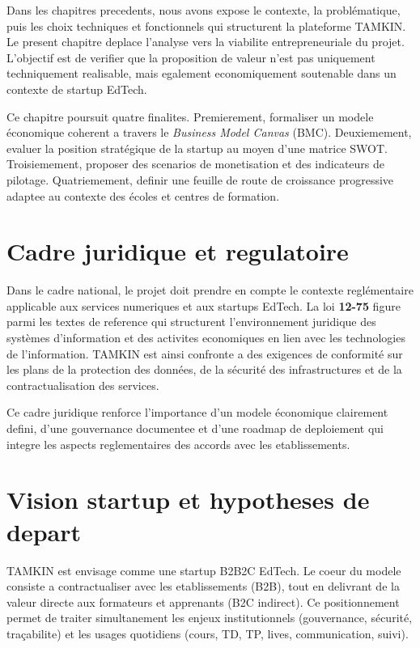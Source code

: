 \documentclass[12pt,a4paper,oneside]{report}
\begin{document}
Dans les chapitres precedents, nous avons expose le contexte, la problématique, puis les choix techniques et fonctionnels qui structurent la plateforme TAMKIN. Le present chapitre deplace l'analyse vers la viabilite entrepreneuriale du projet. L'objectif est de verifier que la proposition de valeur n'est pas uniquement techniquement realisable, mais egalement economiquement soutenable dans un contexte de startup EdTech.

Ce chapitre poursuit quatre finalites. Premierement, formaliser un modele économique coherent a travers le \textit{Business Model Canvas} (BMC)\cite{osterwalder2010bmc}. Deuxiemement, evaluer la position stratégique de la startup au moyen d'une matrice SWOT\cite{kotler2017marketing}. Troisiemement, proposer des scenarios de monetisation et des indicateurs de pilotage. Quatriemement, definir une feuille de route de croissance progressive adaptee au contexte des écoles et centres de formation.

\section{Cadre juridique et regulatoire}

Dans le cadre national, le projet doit prendre en compte le contexte reglémentaire applicable aux services numeriques et aux startups EdTech. La loi \textbf{12-75} figure parmi les textes de reference qui structurent l'environnement juridique des systèmes d'information et des activites economiques en lien avec les technologies de l'information. TAMKIN est ainsi confronte a des exigences de conformité sur les plans de la protection des données, de la sécurité des infrastructures et de la contractualisation des services.

Ce cadre juridique renforce l'importance d'un modele économique clairement defini, d'une gouvernance documentee et d'une roadmap de deploiement qui integre les aspects reglementaires des accords avec les etablissements.

\section{Vision startup et hypotheses de depart}

TAMKIN est envisage comme une startup B2B2C EdTech. Le coeur du modele consiste a contractualiser avec les etablissements (B2B), tout en delivrant de la valeur directe aux formateurs et apprenants (B2C indirect). Ce positionnement permet de traiter simultanement les enjeux institutionnels (gouvernance, sécurité, traçabilite) et les usages quotidiens (cours, TD, TP, lives, communication, suivi).
\end{document}
